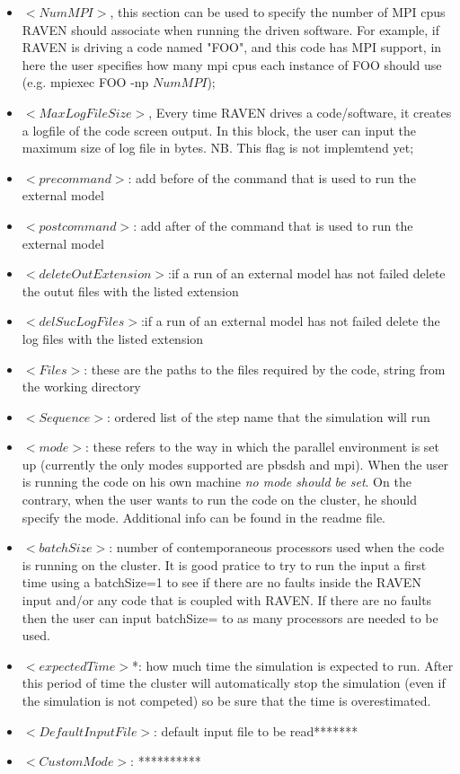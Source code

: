 \begin{itemize}
\item $<NumMPI>$, this section can be used to specify the number of MPI cpus RAVEN should associate when running the driven software. For example, if RAVEN is driving a code named "FOO", and this code has MPI support, in here the user specifies how many mpi cpus each instance of FOO should use (e.g. mpiexec FOO -np $NumMPI$);
\item $<MaxLogFileSize>$, Every time RAVEN drives a code/software, it creates a logfile of the code screen output. In this block, the user can input the maximum size of log file in bytes. NB. This flag is not implemtend yet; 
\item $<precommand>$: add before of the command that is used to run the external model
\item $<postcommand>$: add after of the command that is used to run the external model
\item $<deleteOutExtension>$:if a run of an external model has not failed delete the outut files with the listed extension
\item $<delSucLogFiles>$:if a run of an external model has not failed delete the log files with the listed extension
\item $<Files>$: these are the paths to the files required by the code, string from the working directory 
\item $<Sequence>$: ordered list of the step name that the simulation will run
\item $<mode>$: these refers to the way in which the parallel environment is set up (currently the only modes supported are pbsdsh and mpi). When the user is running the code on his own machine \textit{no mode should be set}. On the contrary, when the user wants to run the code on the cluster, he should specify the mode. Additional info can be found in the readme file. 
\item $<batchSize>$: number of contemporaneous processors used when the code is running on the cluster. It is good pratice to try to run the input a first time using a batchSize=1 to see if there are no faults inside the RAVEN input and/or any code that is coupled with RAVEN. If there are no faults then the user can input batchSize= to as many processors are needed to be used.
\item $<expectedTime>$*: how much time the simulation is expected to run. After this period of time the cluster will automatically stop the simulation (even if the simulation is not competed) so be sure that the time is overestimated.
\item $<DefaultInputFile>$: default input file to be read*******
\item $<CustomMode>$: **********
\end{itemize}


